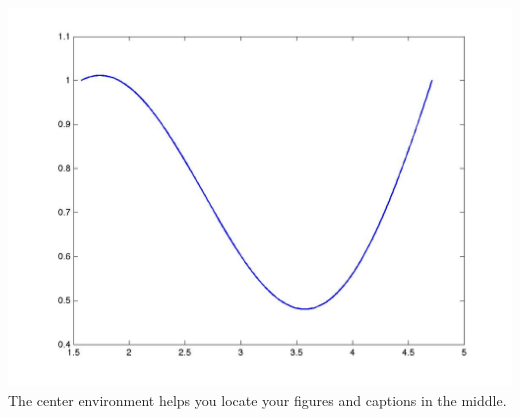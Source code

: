 \documentclass[12pt,a4paper]{article}
\begin{document}
\begin{center}
\includegraphics[scale=0.33]{sample_fig.jpg}\\
The center environment helps you locate your figures and captions in the middle. 
\end{center}
\end{document}
